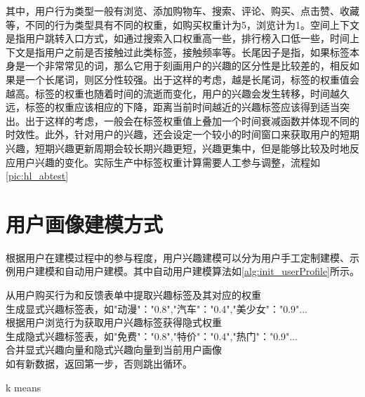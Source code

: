     其中，用户行为类型一般有浏览、添加购物车、搜索、评论、购买、点击赞、收藏等，不同的行为类型具有不同的权重，如购买权重计为5，浏览计为1。空间上下文是指用户跳转入口方式，如通过搜索入口权重高一些，排行榜入口低一些，时间上下文是指用户之前是否接触过此类标签，接触频率等。长尾因子是指，如果标签本身是一个非常常见的词，那么它用于刻画用户的兴趣的区分性是比较差的，相反如果是一个长尾词，则区分性较强。出于这样的考虑，越是长尾词，标签的权重值会越高。标签的权重也随着时间的流逝而变化，用户的兴趣会发生转移，时间越久远，标签的权重应该相应的下降，距离当前时间越近的兴趣标签应该得到适当突出。出于这样的考虑，一般会在标签权重值上叠加一个时间衰减函数并体现不同的时效性。此外，针对用户的兴趣，还会设定一个较小的时间窗口来获取用户的短期兴趣，短期兴趣更新周期会较长期兴趣更短，兴趣更集中，但是能够比较及时地反应用户兴趣的变化。实际生产中标签权重计算需要人工参与调整，流程如\autoref{pic:hl_abtest}
    \begin{figure}
    \centering
      \label{pic:hl_abtest}
    \end{figure}

    \section{用户画像建模方式}
    根据用户在建模过程中的参与程度，用户兴趣建模可以分为用户手工定制建模、示例用户建模和自动用户建模。其中自动用户建模算法如\autoref{alg:init_userProfile}所示。
    \IncMargin{1em}
    \begin{algorithm}
      \BlankLine
        从用户购买行为和反馈表单中提取兴趣标签及其对应的权重\\
        生成显式兴趣标签表，如{"动漫"："0.8","汽车"："0.4","美少女"："0.9"...}\\
        根据用户浏览行为获取用户兴趣标签获得隐式权重\\
        生成隐式兴趣标签表，如{"免费"："0.8","特价"："0.4","热门"："0.9"...}\\
        合并显式兴趣向量和隐式兴趣向量到当前用户画像\\
        如有新数据，返回第一步，否则跳出循环。
    \caption{k means}\label{alg:init_userProfile}
    \end{algorithm}
    \DecMargin{1em}

